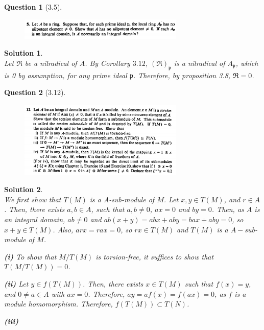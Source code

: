 \documentclass[11pt]{article}
\theoremstyle{plain}
\theoremstyle{quest}
\newtheorem*{question}{Question}
\newtheorem*{solution}{Solution}
\begin{document}
\newpage


\begin{question}[3.5]
\hfill
\begin{figure}[h!]
  \centering
    \includegraphics[width=0.7\textwidth]{d-3-5.png}
\end{figure}
\end{question}
\begin{solution} \hfill \\
Let $\mathfrak{R}$ be a nilradical of $A$. By Corollary $3.12$, 
$(\mathfrak{R})_{\mathfrak{p}}$ is a nilradical of $A_{\mathfrak{p}}$, which is 0 by
assumption, for any prime ideal $\mathfrak{p}$. Therefore, by proposition 3.8,
$\mathfrak{R} = 0$.

\smallskip

 
\end{solution}

\newpage

\begin{question}[3.12]
\hfill
\begin{figure}[h!]
  \centering
    \includegraphics[width=0.7\textwidth]{d-3-12.png}
\end{figure}
\end{question}
\begin{solution} \hfill \\
We first show that $T(M)$ is a A-sub-module of $M$. Let $x,y \in T(M)$, and $r \in A$.
Then, there exists $a,b \in A$, such that $a,b \neq 0$, $ax = 0$ and $by = 0$. 
Then, as $A$ is an integral domain, $ab \neq 0$ and
$ab(x+y) = abx + aby = bax + aby = 0$, so $x + y \in T(M)$. Also, $arx = rax = 0$,
so $rx \in T(M)$ and $T(M)$ is a $A-$sub-module of $M$. \\ 

\smallskip

\noindent 
\textbf{(i)} To show that $M/T(M)$ is torsion-free, it suffices to show that
$T(M/T(M)) = 0$.  \\

\smallskip

\noindent
\textbf{(ii)} Let $y \in f(T(M))$. Then, there exists $x \in T(M)$ such that
$f(x) = y$, and $0 \neq a \in A$ with $ax = 0$. Therefore, $ay = af(x) = f(ax) = 0$,
as $f$ is a module homomorphism. Therefore, $f(T(M)) \subset T(N)$. \\ 

\smallskip

\noindent \textbf{(iii)}

\smallskip


\end{solution}
\end{document}
